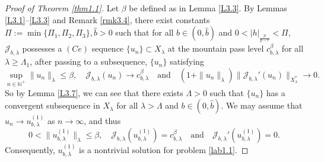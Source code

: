 \documentclass[10pt,a4paper]{amsart}
\numberwithin{equation}{section}
\begin{document}
\begin{proof}[Proof of Theorem \ref{thm1.1}]
Let $\beta$ be defined as in Lemma \ref{L3.3}. By Lemmas \ref{L3.1}--\ref{L3.3} 
and Remark \ref{rmk3.4}, there exist constants 
$\Pi:=\min\{\Pi_1,\Pi_2,\Pi_3\}, \widehat{b}>0$ such that for all $b\in(0, \widehat{b})$ 
and $0<|h|_{\frac{p}{p-r}}<\Pi$, $\mathcal{J}_{b,\lambda}$ possesses a $(Ce)$ sequence 
$\{u_n\}\subset X_\lambda$ at the
mountain pass level $c_{b,\lambda}^\beta$ for all $\lambda\geq\Lambda_1$, 
after passing to a subsequence, $\{u_n\}$ satisfying
$$
\sup_{n\in\mathbb{N}^+}\|u_n\|_\lambda\leq\beta,\quad
 \mathcal{J}_{b,\lambda}(u_n)\to  c_{b,\lambda}^\beta\quad \text{and}\quad
 (1+\|u_n\|_\lambda)\|\mathcal{J}_{b,\lambda}'(u_n)\|_{X_\lambda^*}\to  0.
$$
So by Lemma \ref{L3.7}, we can see that there exists $\Lambda>0$ such that 
$\{u_n\}$ has a convergent subsequence in $X_\lambda$ for all 
$\lambda>\Lambda$ and $b\in(0, \widehat{b})$. We may assume that 
$u_n\to  u_{b,\lambda}^{(1)}$ as $n\to \infty$, and thus
$$
0<\|u_{b,\lambda}^{(1)}\|_\lambda\leq\beta,\quad
\mathcal{J}_{b,\lambda}(u_{b,\lambda}^{(1)})= c_{b,\lambda}^\beta\quad \text{and}\quad
\mathcal{J}_{b,\lambda}'(u_{b,\lambda}^{(1)})=0.
$$
Consequently, $u_{b,\lambda}^{(1)}$ is a nontrivial solution for problem \eqref{lab1.1}.


\end{proof}
\end{document}
